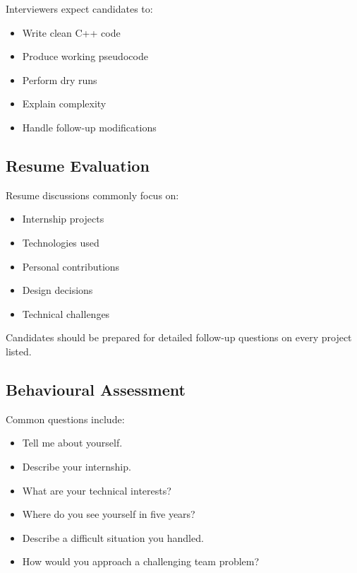 \documentclass[11pt,a4paper]{article}
\begin{document}
Interviewers expect candidates to:

\begin{itemize}
	\item Write clean C++ code
	\item Produce working pseudocode
	\item Perform dry runs
	\item Explain complexity
	\item Handle follow-up modifications
\end{itemize}


\subsection{Resume Evaluation}

Resume discussions commonly focus on:

\begin{itemize}
	\item Internship projects
	\item Technologies used
	\item Personal contributions
	\item Design decisions
	\item Technical challenges
\end{itemize}

Candidates should be prepared for detailed follow-up questions on every project listed.


\subsection{Behavioural Assessment}

Common questions include:

\begin{itemize}
	\item Tell me about yourself.
	\item Describe your internship.
	\item What are your technical interests?
	\item Where do you see yourself in five years?
	\item Describe a difficult situation you handled.
	\item How would you approach a challenging team problem?
\end{itemize}
\end{document}
